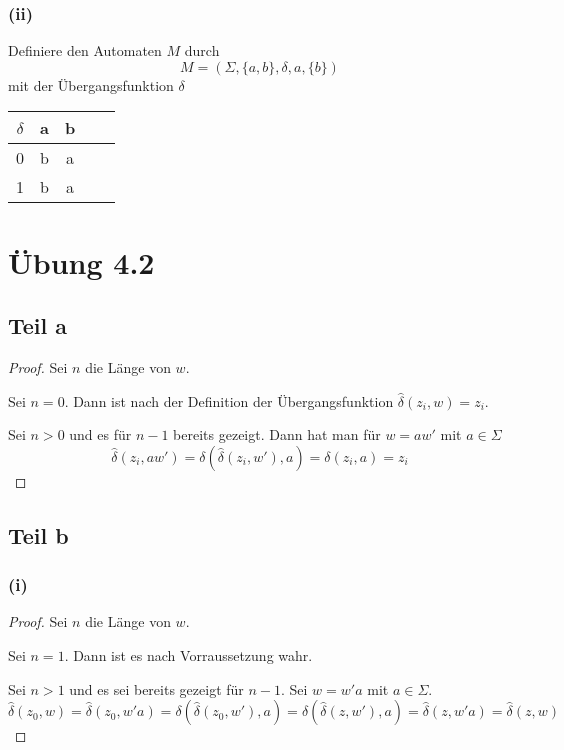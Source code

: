 \documentclass[10pt,a4paper]{article}
\begin{document}
\subsubsection{(ii)}

Definiere den Automaten $M$ durch
\begin{equation}
  M = (\Sigma, \{ a, b \}, \delta, a, \{ b \})
\end{equation}
mit der Übergangsfunktion $\delta$
\\
\begin{tabular}{c|c|c|c|c}
  $\delta$ & a & b\\\hline
  0 & b & a\\\hline
  1 & b & a\\
\end{tabular}

\section{Übung 4.2}

\subsection{Teil a}

\begin{proof}
  Sei $n$ die Länge von $w$.

  Sei $n = 0$.
  Dann ist nach der Definition der Übergangsfunktion $\hat{\delta}(z_{i}, w) = z_{i}$.

  Sei $n > 0$ und es für $n - 1$ bereits gezeigt.
  Dann hat man für $w = aw'$ mit $a \in \Sigma$
  \begin{equation}
    \hat{\delta}(z_{i}, aw') = \delta(\hat{\delta}(z_{i}, w'), a) = \delta(z_{i}, a) = z_{i}
  \end{equation}
\end{proof}

\subsection{Teil b}

\subsubsection{(i)}

\begin{proof}
  Sei $n$ die Länge von $w$.

  Sei $n = 1$.
  Dann ist es nach Vorraussetzung wahr.

  Sei $n > 1$ und es sei bereits gezeigt für $n - 1$.
  Sei $w = w'a$ mit $a \in \Sigma$.
  \begin{equation}
    \hat{\delta}(z_{0}, w) = \hat{\delta}(z_{0}, w'a) = \delta(\hat{\delta}(z_{0}, w'), a) = \delta(\hat{\delta}(z, w'), a) = \hat{\delta}(z, w'a) = \hat{\delta}(z, w)
  \end{equation}
\end{proof}
\end{document}
